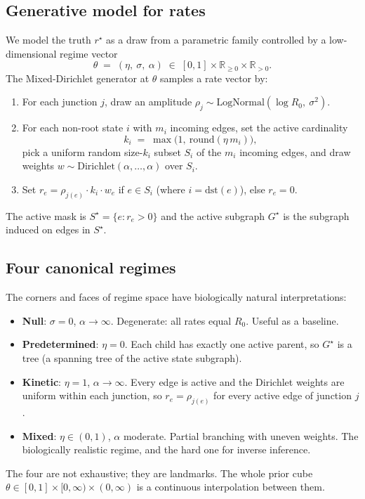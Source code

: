 \documentclass[11pt, a4paper]{article}
\newcommand{\R}{\mathbb{R}}
\newcommand{\rstar}{r^{\star}}
\newcommand{\Sstar}{S^{\star}}
\newcommand{\Gstar}{G^{\star}}
\begin{document}
\subsection{Generative model for rates}

We model the truth $\rstar$ as a draw from a parametric family controlled by a low-dimensional regime vector
\[
\theta \;=\; (\eta,\ \sigma,\ \alpha) \;\in\; [0, 1] \times \R_{\geq 0} \times \R_{> 0}.
\]
The Mixed-Dirichlet generator at $\theta$ samples a rate vector by:
\begin{enumerate}[leftmargin=*, itemsep=2pt, topsep=2pt]
  \item For each junction $j$, draw an amplitude $\rho_j \sim \mathrm{LogNormal}(\log R_0,\ \sigma^2)$.
  \item For each non-root state $i$ with $m_i$ incoming edges, set the active cardinality
    \[
    k_i \;=\; \max\bigl(1,\ \mathrm{round}(\eta\,m_i)\bigr),
    \]
    pick a uniform random size-$k_i$ subset $S_i$ of the $m_i$ incoming edges, and draw weights $w \sim \mathrm{Dirichlet}(\alpha, \dots, \alpha)$ over $S_i$.
  \item Set $r_e = \rho_{j(e)} \cdot k_i \cdot w_e$ if $e \in S_i$ (where $i = \mathrm{dst}(e)$), else $r_e = 0$.
\end{enumerate}
The active mask is $\Sstar = \{e : r_e > 0\}$ and the active subgraph $\Gstar$ is the subgraph induced on edges in $\Sstar$.

\subsection{Four canonical regimes}

The corners and faces of regime space have biologically natural interpretations:
\begin{itemize}[leftmargin=*, itemsep=2pt, topsep=2pt]
  \item \textbf{Null}: $\sigma = 0$, $\alpha \to \infty$. Degenerate: all rates equal $R_0$. Useful as a baseline.
  \item \textbf{Predetermined}: $\eta = 0$. Each child has exactly one active parent, so $\Gstar$ is a tree (a spanning tree of the active state subgraph).
  \item \textbf{Kinetic}: $\eta = 1$, $\alpha \to \infty$. Every edge is active and the Dirichlet weights are uniform within each junction, so $r_e = \rho_{j(e)}$ for every active edge of junction $j$.
  \item \textbf{Mixed}: $\eta \in (0, 1)$, $\alpha$ moderate. Partial branching with uneven weights. The biologically realistic regime, and the hard one for inverse inference.
\end{itemize}
The four are not exhaustive; they are landmarks. The whole prior cube $\theta \in [0,1] \times [0, \infty) \times (0, \infty)$ is a continuous interpolation between them.
\end{document}
